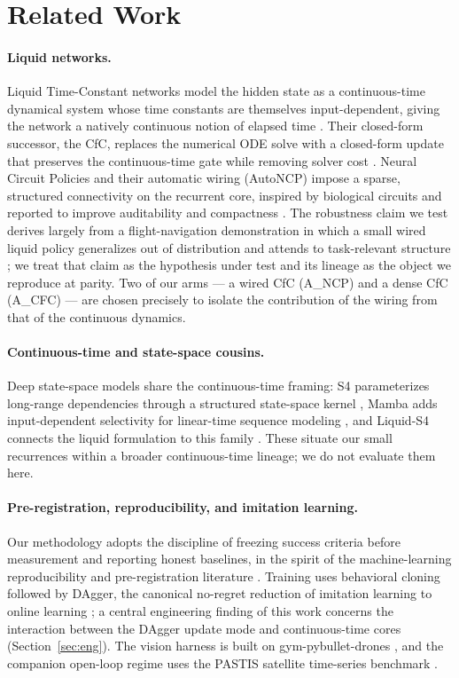 \documentclass[11pt]{article}
\begin{document}
\section{Related Work}
\paragraph{Liquid networks.} Liquid Time-Constant networks model the hidden state as a continuous-time dynamical system whose time constants are themselves input-dependent, giving the network a natively continuous notion of elapsed time \citep{hasani2021ltc}. Their closed-form successor, the CfC, replaces the numerical ODE solve with a closed-form update that preserves the continuous-time gate while removing solver cost \citep{hasani2022cfc}. Neural Circuit Policies and their automatic wiring (AutoNCP) impose a sparse, structured connectivity on the recurrent core, inspired by biological circuits and reported to improve auditability and compactness \citep{lechner2020ncps}. The robustness claim we test derives largely from a flight-navigation demonstration in which a small wired liquid policy generalizes out of distribution and attends to task-relevant structure \citep{chahine2023flight}; we treat that claim as the hypothesis under test and its lineage as the object we reproduce at parity. Two of our arms --- a wired CfC (A\_NCP) and a dense CfC (A\_CFC) --- are chosen precisely to isolate the contribution of the wiring from that of the continuous dynamics.

\paragraph{Continuous-time and state-space cousins.} Deep state-space models share the continuous-time framing: S4 parameterizes long-range dependencies through a structured state-space kernel \citep{gu2022s4}, Mamba adds input-dependent selectivity for linear-time sequence modeling \citep{gu2023mamba}, and Liquid-S4 connects the liquid formulation to this family \citep{hasani2023liquids4}. These situate our small recurrences within a broader continuous-time lineage; we do not evaluate them here.

\paragraph{Pre-registration, reproducibility, and imitation learning.} Our methodology adopts the discipline of freezing success criteria before measurement and reporting honest baselines, in the spirit of the machine-learning reproducibility and pre-registration literature \citep{pineau2021reproducibility,sogaard2023preregistration}. Training uses behavioral cloning followed by DAgger, the canonical no-regret reduction of imitation learning to online learning \citep{ross2011dagger}; a central engineering finding of this work concerns the interaction between the DAgger update mode and continuous-time cores (Section~\ref{sec:eng}). The vision harness is built on gym-pybullet-drones \citep{panerati2021gym}, and the companion open-loop regime uses the PASTIS satellite time-series benchmark \citep{garnot2021pastis}.
\end{document}
